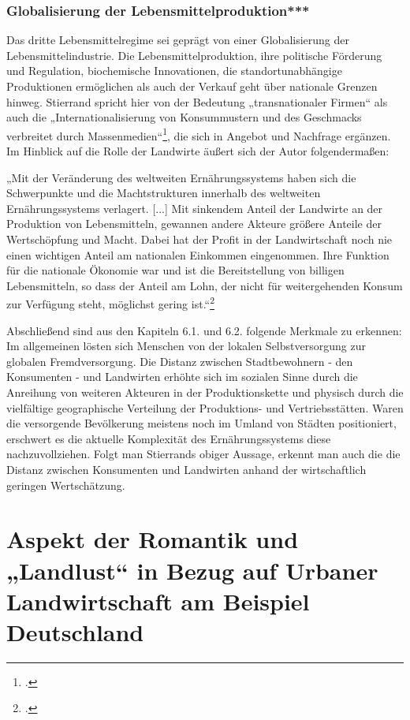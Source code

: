 \documentclass{scrartcl}
\begin{document}
\subsubsection*{Globalisierung der Lebensmittelproduktion***}
Das dritte Lebensmittelregime sei geprägt von einer Globalisierung der Lebensmittelindustrie. Die Lebensmittelproduktion, ihre politische Förderung und Regulation, biochemische Innovationen, die standortunabhängige Produktionen ermöglichen als auch der Verkauf geht über nationale Grenzen hinweg. Stierrand spricht hier von der Bedeutung „transnationaler Firmen“ als auch die „Internationalisierung von Konsummustern und des Geschmacks verbreitet durch Massenmedien“\footcites[Vgl.][S.24ff]{Stierand2008StadtLebensmittel}, die sich in Angebot und Nachfrage ergänzen. Im Hinblick auf die Rolle der Landwirte äußert sich der Autor folgendermaßen:
\begin{displayquote}
„Mit der Veränderung des weltweiten Ernährungssystems haben sich die Schwerpunkte und die Machtstrukturen innerhalb des weltweiten Ernährungssystems verlagert. [...] Mit sinkendem Anteil der Landwirte an der Produktion von Lebensmitteln, gewannen andere Akteure größere Anteile der Wertschöpfung und Macht. Dabei hat der Profit in der Landwirtschaft noch nie einen wichtigen Anteil am nationalen Einkommen eingenommen. Ihre Funktion für die nationale Ökonomie war und ist die Bereitstellung von billigen Lebensmitteln, so dass der Anteil am Lohn, der nicht für weitergehenden Konsum zur Verfügung steht, möglichst gering ist.“\footcite[S.25]{Stierand2008StadtLebensmittel}
\end{displayquote}

Abschließend sind aus den Kapiteln 6.1. und 6.2. folgende Merkmale zu erkennen: Im allgemeinen lösten sich Menschen von der lokalen Selbstversorgung zur globalen Fremdversorgung. Die Distanz zwischen Stadtbewohnern - den Konsumenten - und Landwirten erhöhte sich im sozialen Sinne durch die Anreihung von weiteren Akteuren in der Produktionskette und physisch durch die vielfältige geographische Verteilung der Produktions- und Vertriebsstätten. Waren die versorgende Bevölkerung meistens noch im Umland von Städten positioniert, erschwert es die aktuelle Komplexität des Ernährungssystems diese nachzuvollziehen. Folgt man Stierrands obiger Aussage, erkennt man auch die die Distanz zwischen Konsumenten und Landwirten anhand der wirtschaftlich geringen Wertschätzung. 


\section{Aspekt der Romantik und „Landlust“ in Bezug auf Urbaner Landwirtschaft am Beispiel Deutschland}
\end{document}
